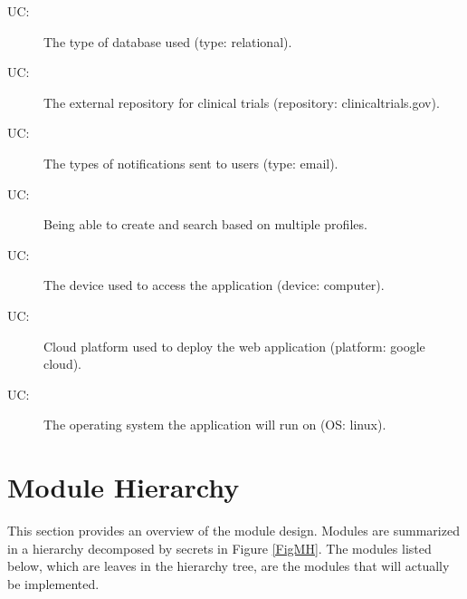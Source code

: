\documentclass[12pt, titlepage]{article}
\newcounter{ucnum}
\newcommand{\uctheucnum}{UC\theucnum}
\begin{document}
\begin{description}
\item[ \uctheucnum:] The type of database used (type: relational).
\item[ \uctheucnum:] The external repository for clinical trials (repository: clinicaltrials.gov).
\item[ \uctheucnum:] The types of notifications sent to users (type: email).
\item[ \uctheucnum:] Being able to create and search based on multiple profiles.
\item[ \uctheucnum:] The device used to access the application (device: computer).
\item[ \uctheucnum:] Cloud platform used to deploy the web application (platform: google cloud).
\item[ \uctheucnum:] The operating system the application will run on (OS: linux).
\end{description}

\section{Module Hierarchy} \label{SecMH}

This section provides an overview of the module design. Modules are summarized
in a hierarchy decomposed by secrets in Figure \ref{FigMH}. The modules listed
below, which are leaves in the hierarchy tree, are the modules that will
actually be implemented.\\
\end{document}
